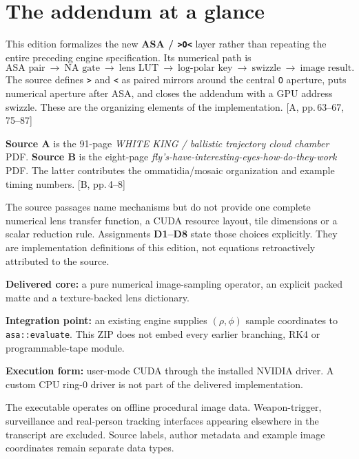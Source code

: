 \documentclass[11pt,a4paper]{article}
\newcommand{\src}[1]{\textcolor{muted}{[A, #1]}}
\newcommand{\fly}[1]{\textcolor{muted}{[B, #1]}}
\newcommand{\code}[1]{\texttt{#1}}
\begin{document}
\section*{The addendum at a glance}
This edition formalizes the new \textbf{ASA / \code{>O<}} layer rather than repeating the entire preceding engine specification. Its numerical path is
\begin{equation}
\boxed{\text{ASA pair}\ \to\ \text{NA gate}\ \to\ \text{lens LUT}\ \to\ \text{log-polar key}\ \to\ \text{swizzle}\ \to\ \text{image result}.}
\end{equation}
The source defines \code{>} and \code{<} as paired mirrors around the central \code{O} aperture, puts numerical aperture after ASA, and closes the addendum with a GPU address swizzle. These are the organizing elements of the implementation. \src{pp.\,63--67, 75--87}

\textbf{Source A} is the 91-page \emph{WHITE KING / ballistic trajectory cloud chamber} PDF. \textbf{Source B} is the eight-page \emph{fly's-have-interesting-eyes-how-do-they-work} PDF. The latter contributes the ommatidia/mosaic organization and example timing numbers. \fly{pp.\,4--8}

The source passages name mechanisms but do not provide one complete numerical lens transfer function, a CUDA resource layout, tile dimensions or a scalar reduction rule. Assignments \textbf{D1--D8} state those choices explicitly. They are implementation definitions of this edition, not equations retroactively attributed to the source.

\begin{panel}
\textbf{Delivered core:} a pure numerical image-sampling operator, an explicit packed matte and a texture-backed lens dictionary.\par
\textbf{Integration point:} an existing engine supplies $(\rho,\phi)$ sample coordinates to \code{asa::evaluate}. This ZIP does not embed every earlier branching, RK4 or programmable-tape module.\par
\textbf{Execution form:} user-mode CUDA through the installed NVIDIA driver. A custom CPU ring-0 driver is not part of the delivered implementation.
\end{panel}

The executable operates on offline procedural image data. Weapon-trigger, surveillance and real-person tracking interfaces appearing elsewhere in the transcript are excluded. Source labels, author metadata and example image coordinates remain separate data types.
\end{document}
